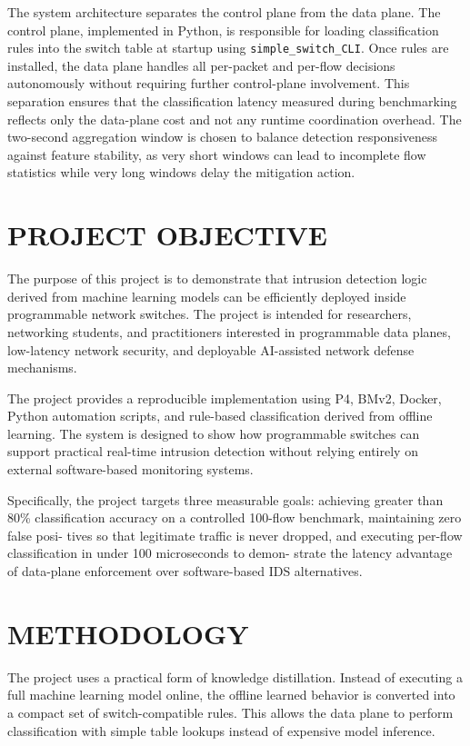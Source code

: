 \documentclass[conference]{IEEEtran}
\begin{document}
The system architecture separates the control plane from
the data plane. The control plane, implemented in Python,
is responsible for loading classification rules into the switch
table at startup using \verb|simple_switch_CLI|. Once rules are
installed, the data plane handles all per-packet and per-flow
decisions autonomously without requiring further control-plane
involvement. This separation ensures that the classification
latency measured during benchmarking reflects only the
data-plane cost and not any runtime coordination overhead.
The two-second aggregation window is chosen to balance
detection responsiveness against feature stability, as very
short windows can lead to incomplete flow statistics while
very long windows delay the mitigation action.

\section{PROJECT OBJECTIVE}

The purpose of this project is to demonstrate that intrusion
detection logic derived from machine learning models can be
efficiently deployed inside programmable network switches.
The project is intended for researchers, networking students,
and practitioners interested in programmable data planes,
low-latency network security, and deployable AI-assisted
network defense mechanisms.

The project provides a reproducible implementation using
P4, BMv2, Docker, Python automation scripts, and rule-based
classification derived from offline learning. The system is
designed to show how programmable switches can support
practical real-time intrusion detection without relying entirely
on external software-based monitoring systems.

Specifically, the project targets three measurable goals:
achieving greater than 80\% classification accuracy on a
controlled 100-flow benchmark, maintaining zero false posi-
tives so that legitimate traffic is never dropped, and executing
per-flow classification in under 100 microseconds to demon-
strate the latency advantage of data-plane enforcement over
software-based IDS alternatives.

\section{METHODOLOGY}

The project uses a practical form of knowledge distillation.
Instead of executing a full machine learning model online,
the offline learned behavior is converted into a compact set of
switch-compatible rules. This allows the data plane to perform
classification with simple table lookups instead of expensive
model inference.
\end{document}
